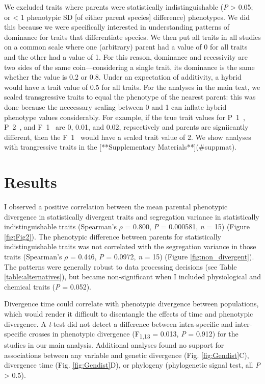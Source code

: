 \documentclass[times, twoside, watermark]{zHenriquesLab-StyleBioRxiv}
\begin{document}
We excluded traits where parents were statistically indistinguishable (\textit{P} > 0.05; or < 1 phenotypic SD [of either parent species] difference) phenotypes. We did this because we were specifically interested in understanding patterns of dominance for traits that differentiate species. We then put all traits in all studies on a common scale where one (arbitrary) parent had a value of 0 for all traits and the other had a value of 1. For this reason, dominance and recessivity are two sides of the same coin---considering a single trait, its dominance is the same whether the value is 0.2 or 0.8. Under an expectation of additivity, a hybrid would have a trait value of 0.5 for all traits. For the analyses in the main text, we scaled transgressive traits to equal the phenotype of the nearest parent: this was done because the neccessary scaling between 0 and 1 can inflate hybrid phenotype values considerably. For example, if the true trait values for P~1~, P~2~, and F~1~ are 0, 0.01, and 0.02, repsectively and parents are signiicantly different, then the F~1~ would have a scaled trait value of 2. We show analyses with trangressive traits in the [**Supplementary Materials**](#suppmat). \par


\section*{Results}
I observed a positive correlation between the mean parental phenotypic divergence in statistically divergent traits and segregation variance in statistically indistinguishable traits (Spearman's $\rho$ = 0.800, \textit{P} = 0.000581, \textit{n} = 15) (Figure \ref{fig:Fig2}). The phenotypic difference between parents for statistically indistinguishable traits was not correlated with the segregation variance in those traits (Spearman's $\rho$ = 0.446, \textit{P} = 0.0972, \textit{n} = 15) (Figure \ref{fig:non_divergent}). The patterns were generally robust to data processing decisions (see Table \ref{table:alternatives}), but became non-significant when I included physiological and chemical traits (\textit{P} = 0.052). \par

Divergence time could correlate with phenotypic divergence between populations, which would render it difficult to disentangle the effects of time and phenotypic divergence. A \textit{t}-test did not detect a difference between intra-specific and inter-specific crosses in phenotypic divergence (F\textsubscript{1,13} = 0.013, \textit{P} = 0.912) for the studies in our main analysis. Additional analyses found no support for associations between any variable and genetic divergence (Fig. \ref{fig:Gendist}C), divergence time (Fig. \ref{fig:Gendist}D), or phylogeny (phylogenetic signal test, all \textit{P} > 0.5).
\end{document}
